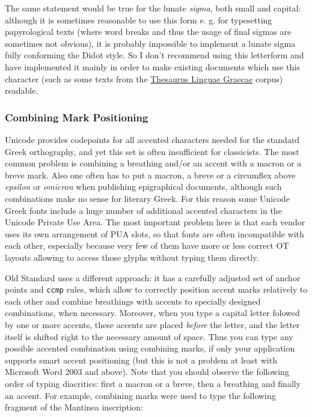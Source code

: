 \documentclass[12pt,a4paper,openany]{book}
\begin{document}
The same statement would be true for the lunate \textit{sigma}, both small and
capital: although it is sometimes reasonable to use this form e. g. for 
typesetting papyrological texts (where word breaks and thus the usage of
final sigmas are sometimes not obvious), it is probably impossible to 
implement a lunate sigma fully conforming the Didot style. So I don't
recommend using this letterform and have implemented it mainly in order
to make existing documents which use this character (such as some texts 
from the \href{http://www.tlg.uci.edu}{Thesaurus Linguae Graecae} corpus)
readable.

\subsubsection{Combining Mark Positioning}

Unicode provides codepoints for all accented characters needed for the
standard Greek orthography, and yet this set is often insufficient for
classicists. The most common problem is combining a breathing and/or an
accent with a macron or a breve mark. Also one often has to put a macron,
a breve or a circumflex above \textit{epsilon} or \textit{omicron} when
publishing epigraphical documents, although such combinations make no sense
for literary Greek. For this reason some Unicode Greek fonts include a huge
number of additional accented characters in the Unicode Private Use Area.
The most important problem here is that each vendor uses its own
arrangement of PUA slots, so that fonts are often incompatible with each
other, especially because very few of them have more or less correct OT
layouts allowing to access those glyphs without typing them directly.

Old Standard uses a different approach: it has a carefully adjusted set of
anchor points and \texttt{ccmp} rules, which allow to correctly position
accent marks relatively to each other and combine breathings with accents
to specially designed combinations, when necessary. Moreover, when you
type a capital letter folowed by one or more accents, these accents are
placed \textit{before} the letter, and the letter itself is shifted right
to the necessary amount of space. Thus you can type any possible accented
combination using combining marks, if only your application supports smart
accent positioning (but this is not a problem at least with Microsoft Word
2003 and above). Note that you should observe the following order of typing
diacritics: first a macron or a breve, then a breathing and finally an
accent. For example, combining marks were used to type the following
fragment of the Mantinea inscription:
\end{document}
